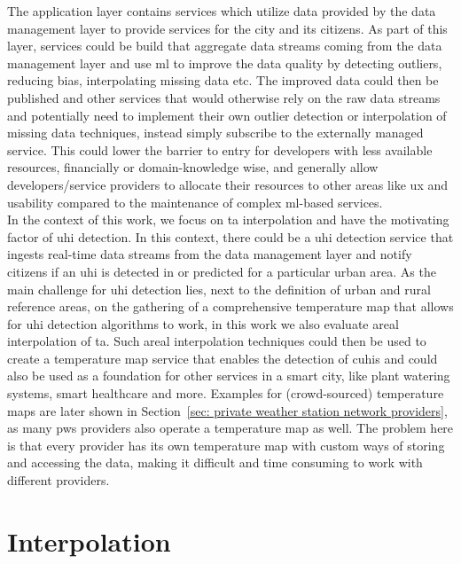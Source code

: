 The application layer contains services which utilize data provided by the data management layer to provide services for the city and its citizens. As part of this layer, services could be build that aggregate data streams coming from the data management layer and use \gls{ml} to improve the data quality by detecting outliers, reducing bias, interpolating missing data etc. The improved data could then be published and other services that would otherwise rely on the raw data streams and potentially need to implement their own outlier detection or interpolation of missing data techniques, instead simply subscribe to the externally managed service. This could lower the barrier to entry for developers with less available resources, financially or domain-knowledge wise, and generally allow developers/service providers to allocate their resources to other areas like \gls{ux} and usability compared to the maintenance of complex \gls{ml}-based services.\\
In the context of this work, we focus on \gls{ta} interpolation and have the motivating factor of \gls{uhi} detection. In this context, there could be a \gls{uhi} detection service that ingests real-time data streams from the data management layer and notify citizens if an \gls{uhi} is detected in or predicted for a particular urban area. As the main challenge for \gls{uhi} detection lies, next to the definition of urban and rural reference areas, on the gathering of a comprehensive temperature map that allows for \gls{uhi} detection algorithms to work, in this work we also evaluate areal interpolation of \gls{ta}. Such areal interpolation techniques could then be used to create a temperature map service that enables the detection of \gls{cuhi}s and could also be used as a foundation for other services in a smart city, like plant watering systems, smart healthcare and more. Examples for (crowd-sourced) temperature maps are later shown in Section~\ref{sec: private weather station network providers}, as many \gls{pws} providers also operate a temperature map as well. The problem here is that every provider has its own temperature map with custom ways of storing and accessing the data, making it difficult and time consuming to work with different providers.

\section{Interpolation}

